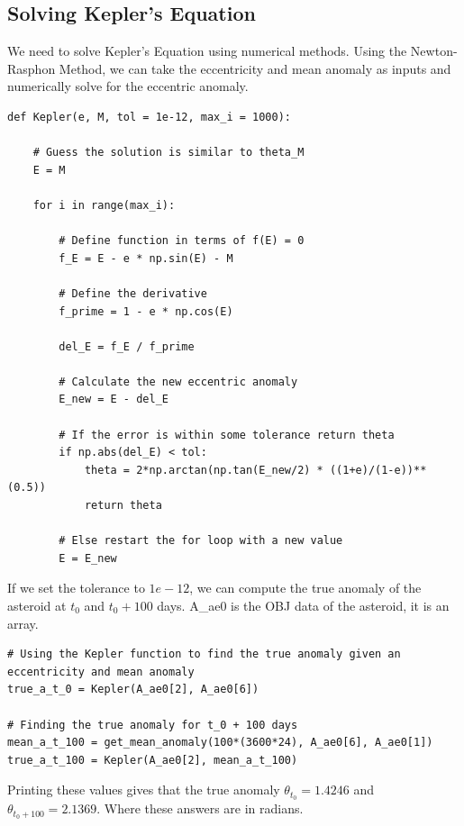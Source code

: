 \documentclass[12pt,twocolumn]{article}  %
\begin{document}
\subsection{Solving Kepler's Equation}

We need to solve Kepler's Equation using numerical methods. Using the Newton-Rasphon Method,
 we can take the eccentricity and mean anomaly as 
inputs and numerically solve for the eccentric anomaly. 

\begin{lstlisting}
def Kepler(e, M, tol = 1e-12, max_i = 1000):
    
    # Guess the solution is similar to theta_M
    E = M
    
    for i in range(max_i):
        
        # Define function in terms of f(E) = 0
        f_E = E - e * np.sin(E) - M
        
        # Define the derivative
        f_prime = 1 - e * np.cos(E)
        
        del_E = f_E / f_prime
        
        # Calculate the new eccentric anomaly
        E_new = E - del_E
        
        # If the error is within some tolerance return theta
        if np.abs(del_E) < tol:
            theta = 2*np.arctan(np.tan(E_new/2) * ((1+e)/(1-e))**(0.5))
            return theta
        
        # Else restart the for loop with a new value
        E = E_new
\end{lstlisting}
\vspace{0.5cm}
\hspace{0.54em} If we set the tolerance to $1e-12$, we can compute the true anomaly of the asteroid 
at $t_0$ and $t_0 + 100$ days. A\_ae0 is the OBJ data of the asteroid, it is an array.


\begin{lstlisting}
# Using the Kepler function to find the true anomaly given an eccentricity and mean anomaly
true_a_t_0 = Kepler(A_ae0[2], A_ae0[6])

# Finding the true anomaly for t_0 + 100 days
mean_a_t_100 = get_mean_anomaly(100*(3600*24), A_ae0[6], A_ae0[1])
true_a_t_100 = Kepler(A_ae0[2], mean_a_t_100)
\end{lstlisting}

\indent Printing these values gives that the true anomaly $\theta_{t_0} = 1.4246$ and $\theta_{t_0 + 100} = 2.1369$. 
Where these answers are in radians.
\end{document}

